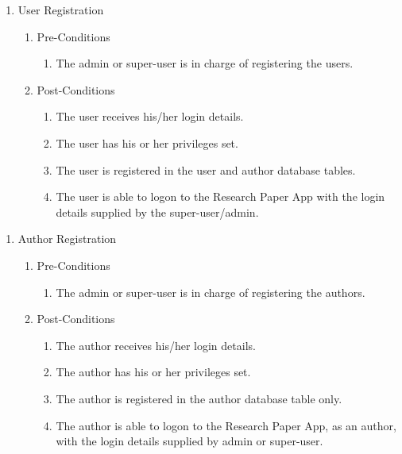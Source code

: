\documentclass[hidelinks,a4paper,12pt]{article}
\begin{document}
	\noindent  
	
	\begin{enumerate}
		\item  User Registration
		
		\begin{enumerate}
			\item  Pre-Conditions
			
			\begin{enumerate}
				\item  The admin or super-user is in charge of registering the users.
			\end{enumerate}
			
			\item  Post-Conditions
			
			\begin{enumerate}
				\item  The user receives his/her login details.
				
				\item  The user has his or her privileges set.
				
				\item  The user is registered in the user and author database tables.
				
				\item  The user is able to logon to the Research Paper App with the login details supplied by the super-user/admin.
			\end{enumerate}
		\end{enumerate}
	\end{enumerate}
	
	\noindent  
	
	\begin{enumerate}
		\item  Author Registration
		
		\begin{enumerate}
			\item  Pre-Conditions
			
			\begin{enumerate}
				\item  The admin or super-user is in charge of registering the authors.
			\end{enumerate}
			
			\item  Post-Conditions
			
			\begin{enumerate}
				\item  The author receives his/her login details.
				
				\item  The author has his or her privileges set.
				
				\item  The author is registered in the author database table only.
				
				\item  The author is able to logon to the Research Paper App, as an author, with the login details supplied by admin or super-user.
			\end{enumerate}
		\end{enumerate}
	\end{enumerate}
	
\end{document}
